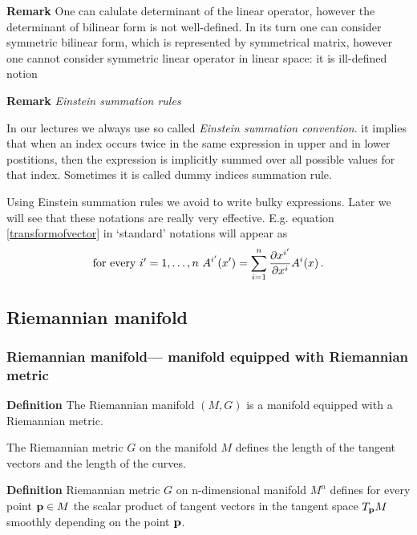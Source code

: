 \documentclass[12pt]{article}
\theoremstyle{theorem}
\numberwithin{equation}{section}
\begin{document}
 
			  {\footnotesize	
			  {\bf Remark}
One can  calulate determinant of the linear operator, however
the determinant of bilinear form is not well-defined.
In its turn one can consider symmetric bilinear form, which is 
represented by symmetrical matrix, however one cannot consider
symmetric linear operator in linear space: it is ill-defined notion}







{\bf Remark} {\it Einstein  summation rules}


 In our lectures we always use so called {\it Einstein summation convention}.
 it  implies that when an index occurs twice
in the same expression in upper and in lower postitions, then
 the expression is implicitly summed over all possible values
for that index.
  Sometimes it is called dummy indices summation rule.
 

   Using Einstein summation rules we avoid to write
bulky expressions. 
Later we will see that these notations are really very effective.
E.g. equation \eqref{transformofvector}
in `standard' notations will appear as
         $$
  \hbox {for every $i'=1,\dots,n$}\,\,
A^{i'}(x')=\sum_{i=1}^n{\partial x^{i'}\over \partial x^i}A^i(x)\,.
         $$ 

\subsection {Riemannian manifold}




    \subsubsection {Riemannian manifold---
manifold equipped with Riemannian metric}

{\bf Definition} The Riemannian manifold $(M,G)$ is a
manifold equipped with a Riemannian metric.



  The Riemannian metric $G$ on the manifold $M$ defines the
  length of the tangent vectors and the length of the curves.

{\bf Definition}
  Riemannian metric $G$ on n-dimensional manifold $M^n$
  defines for every point ${\bf p}\in M$ the scalar product
  of tangent vectors in the tangent space $T_{\bf p} M$
  smoothly depending on the point ${\bf p} $.
\end{document}
